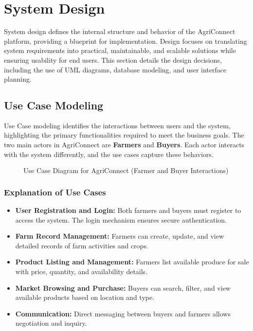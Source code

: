 \documentclass[12pt,a4paper]{article}
\begin{document}
\section{System Design}

System design defines the internal structure and behavior of the AgriConnect platform, providing a blueprint for implementation. Design focuses on translating system requirements into practical, maintainable, and scalable solutions while ensuring usability for end users. This section details the design decisions, including the use of UML diagrams, database modeling, and user interface planning.

\subsection{Use Case Modeling}

Use Case modeling identifies the interactions between users and the system, highlighting the primary functionalities required to meet the business goals. The two main actors in AgriConnect are \textbf{Farmers} and \textbf{Buyers}. Each actor interacts with the system differently, and the use cases capture these behaviors.

\begin{figure}[H]
\centering
{}
\caption{Use Case Diagram for AgriConnect (Farmer and Buyer Interactions)}
\end{figure}

\subsubsection{Explanation of Use Cases}

\begin{itemize}
    \item \textbf{User Registration and Login:} Both farmers and buyers must register to access the system. The login mechanism ensures secure authentication.
    \item \textbf{Farm Record Management:} Farmers can create, update, and view detailed records of farm activities and crops.
    \item \textbf{Product Listing and Management:} Farmers list available produce for sale with price, quantity, and availability details.
    \item \textbf{Market Browsing and Purchase:} Buyers can search, filter, and view available products based on location and type.
    \item \textbf{Communication:} Direct messaging between buyers and farmers allows negotiation and inquiry.
\end{itemize}
\end{document}
